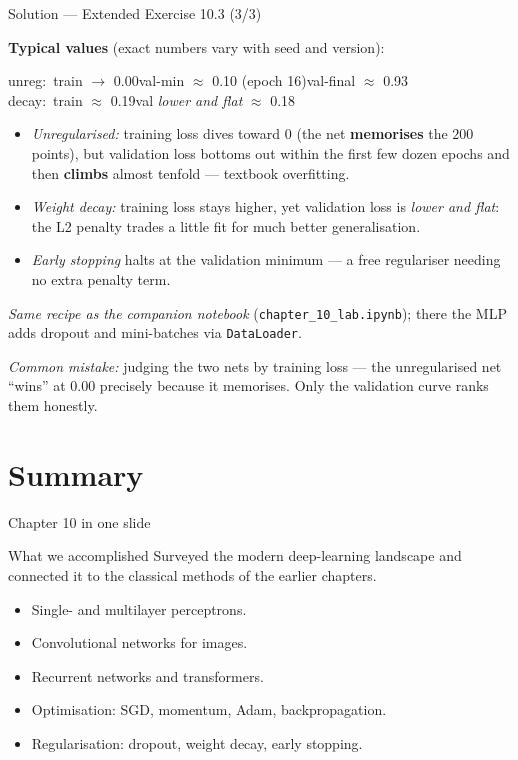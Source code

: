 \documentclass[aspectratio=169,11pt]{beamer}
\begin{document}
\begin{frame}{Solution --- Extended Exercise 10.3 (3/3)}
\begin{solutionbox}
  \textbf{Typical values} (exact numbers vary with seed and version):
  \begin{center}\ttfamily\footnotesize
  unreg:\ train $\to$ 0.00\quad val-min $\approx$ 0.10 (epoch 16)\quad val-final $\approx$ 0.93\\[2pt]
  decay:\ train $\approx$ 0.19\quad val \emph{lower and flat} $\approx$ 0.18
  \end{center}
  \begin{itemize}
    \item \emph{Unregularised:} training loss dives toward $0$ (the net \textbf{memorises}
          the $200$ points), but validation loss bottoms out within the first few dozen
          epochs and then \textbf{climbs} almost tenfold --- textbook overfitting.
    \item \emph{Weight decay:} training loss stays higher, yet validation loss is
          \emph{lower and flat}: the L2 penalty trades a little fit for much
          better generalisation.
    \item \emph{Early stopping} halts at the validation minimum --- a free regulariser
          needing no extra penalty term.
  \end{itemize}
  \textit{Same recipe as the companion notebook} (\texttt{chapter\_10\_lab.ipynb});
  there the MLP adds dropout and mini-batches via \texttt{DataLoader}.

  \smallskip
  \textit{Common mistake:} judging the two nets by training loss --- the
  unregularised net ``wins'' at $0.00$ precisely because it memorises.
  Only the validation curve ranks them honestly.
\end{solutionbox}
\end{frame}

\section{Summary}

\begin{frame}{Chapter 10 in one slide}
  \begin{block}{What we accomplished}
    Surveyed the modern deep-learning landscape and connected it to
    the classical methods of the earlier chapters.
  \end{block}
  \begin{itemize}
    \item Single- and multilayer perceptrons.
    \item Convolutional networks for images.
    \item Recurrent networks and transformers.
    \item Optimisation: SGD, momentum, Adam, backpropagation.
    \item Regularisation: dropout, weight decay, early stopping.
  \end{itemize}
\end{frame}
\end{document}
